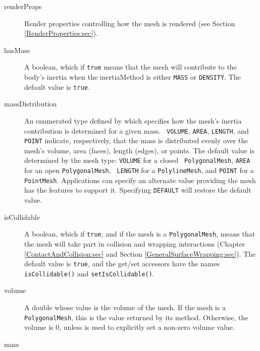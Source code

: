 \begin{description}

\item[renderProps]\mbox{}

Render properties controlling how the mesh is
rendered (see Section \ref{RenderProperties:sec}).

\item[hasMass]\mbox{} 

A boolean, which if {\tt true} means that the mesh
will contribute to the body's inertia when the {\sf inertiaMethod}
is either {\tt MASS} or {\tt DENSITY}. The default value is {\tt true}.

\item[massDistribution]\mbox{} 

An enumerated type defined by
 which specifies how the
mesh's inertia contribution is determined for a given mass.  {\tt
VOLUME}, {\tt AREA}, {\tt LENGTH}, and {\tt POINT} indicate,
respectively, that the mass is distributed evenly over the mesh's
volume, area (faces), length (edges), or points. The default value is
determined by the mesh type: {\tt VOLUME} for a closed {\tt
PolygonalMesh}, {\tt AREA} for an open {\tt PolygonalMesh}, {\tt
LENGTH} for a {\tt PolylineMesh}, and {\tt POINT} for a {\tt
PointMesh}. Applications can specify an alternate value providing the
mesh has the features to support it. Specifying {\tt DEFAULT} will
restore the default value.

\item[isCollidable]\mbox{} 

A boolean, which if {\tt true}, and if the mesh is a
{\tt PolygonalMesh}, means that the mesh will take part in collision
and wrapping interactions (Chapter \ref{ContactAndCollision:sec} and
Section \ref{GeneralSurfaceWrapping:sec}). The default value is {\tt true},
and the get/set accessors have the names {\tt isCollidable()} and
{\tt setIsCollidable()}.

\item[volume]\mbox{} 

A double whose value is the volume of the mesh.  If the
mesh is a {\tt PolygonalMesh}, this is the value returned by its
 method.
Otherwise, the volume is 0, unless
 is
used to explicitly set a non-zero volume value.

\item[mass]\mbox{} 


\end{description}
